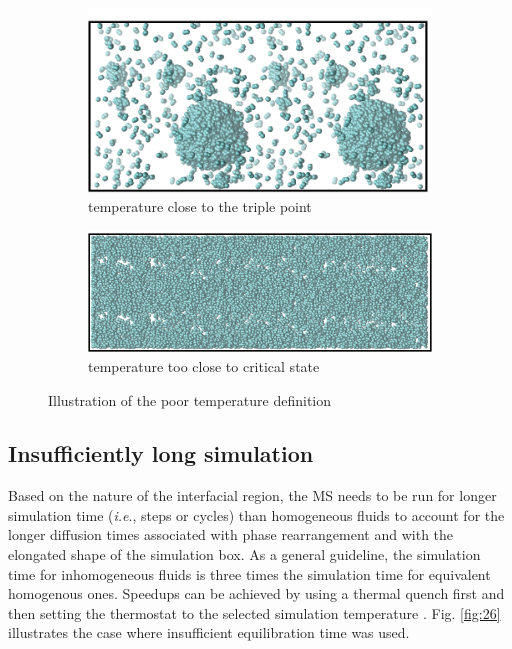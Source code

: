 \documentclass[9pt,bestpractices]{livecoms}
\begin{document}
\begin{figure}
	\centering
	\begin{subfigure}{0.3\textwidth} %
    \includegraphics[width=1\textwidth]{gfx/image75.png}
    \caption{temperature close to the triple point}
	\end{subfigure}
	\begin{subfigure}{0.3\textwidth} %
    \includegraphics[width=1\textwidth]{gfx/image76.png}
    \caption{temperature too close to critical state}
	\end{subfigure}
\caption{Illustration of the poor temperature definition}
\label{fig:25}
\end{figure}

\subsection{Insufficiently long simulation} 

Based on the nature of the interfacial region, the MS needs to be run for
longer simulation time (\textit{i.e}., steps or cycles) than homogeneous fluids
to account for the longer diffusion times associated with phase rearrangement
and with the elongated shape of the simulation box. As a general guideline, the
simulation time for inhomogeneous fluids is three times the simulation time for
equivalent homogenous ones. Speedups can be achieved by using a thermal quench
first and then setting the thermostat to the selected simulation temperature
\citep{gelb2002}. Fig. \ref{fig:26} illustrates the case where insufficient equilibration time was
used.
\end{document}
